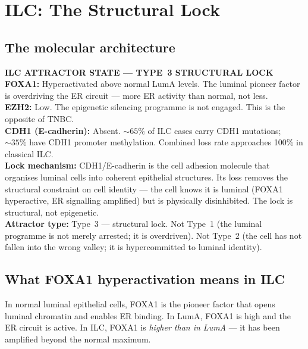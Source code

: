 \documentclass[12pt, a4paper]{article}
\begin{document}
\section{ILC: The Structural Lock}

\subsection{The molecular architecture}

\begin{center}
\colorbox{ilcbox}{
\begin{minipage}{0.88\textwidth}
\vspace{0.5em}
\textbf{ILC ATTRACTOR STATE --- TYPE~3
STRUCTURAL LOCK}\\[0.4em]
\textbf{FOXA1:} Hyperactivated above normal
LumA levels. The luminal pioneer factor is
overdriving the ER circuit --- more ER activity
than normal, not less.\\[0.3em]
\textbf{EZH2:} Low. The epigenetic silencing
programme is not engaged. This is the opposite
of TNBC.\\[0.3em]
\textbf{CDH1 (E-cadherin):} Absent.
${\sim}65\%$ of ILC cases carry CDH1 mutations;
${\sim}35\%$ have CDH1 promoter methylation.
Combined loss rate approaches 100\% in classical
ILC.\\[0.3em]
\textbf{Lock mechanism:} CDH1/E-cadherin is the
cell adhesion molecule that organises luminal
cells into coherent epithelial structures. Its
loss removes the structural constraint on cell
identity --- the cell knows it is luminal
(FOXA1 hyperactive, ER signalling amplified)
but is physically disinhibited. The lock is
structural, not epigenetic.\\[0.3em]
\textbf{Attractor type:} Type~3 --- structural
lock. Not Type~1 (the luminal programme is not
merely arrested; it is overdriven). Not Type~2
(the cell has not fallen into the wrong valley;
it is hypercommitted to luminal identity).
\vspace{0.5em}
\end{minipage}}
\end{center}

\subsection{What FOXA1 hyperactivation means
in ILC}

In normal luminal epithelial cells, FOXA1 is the
pioneer factor that opens luminal chromatin and
enables ER binding. In LumA, FOXA1 is high and
the ER circuit is active. In ILC, FOXA1 is
\textit{higher than in LumA} --- it has been
amplified beyond the normal maximum.
\end{document}
